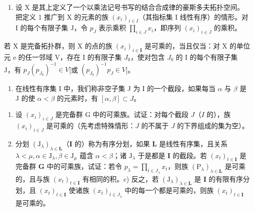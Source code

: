 \ExerciseAppendix

\begin{enumerate}
\def\labelenumi{\arabic{enumi})}
\tightlist
\item
  设 X 是其上定义了一个以乘法记号书写的结合合成律的豪斯多夫拓扑空间。把定义 1 推广到 X 的元素的族 \((x_{i})_{i\in I}\)（其指标集 I 线性有序）的情形。对 I 的每个有限子集 J，令 \(p_{J}\) 表示乘积 \(\prod_{i\in J} x_{i}\)，即序列 \((x_{i})_{i\in J}\) 的乘积。
\end{enumerate}

若 X 是完备拓扑群，则 X 的点的族 \((x_{i})_{i\in\mathbf{I}}\) 是可乘的，当且仅当：对 X 的单位元 e 的任一邻域 V，存在 I 的有限子集 \(J_{0}\)，使对包含 \(J_{0}\) 的 I 的每个有限子集 J，有 \(p_{J}(p_{J_{0}})^{-1}\in V\){[}或 \((p_{J_{0}})^{-1}p_{J}\in V\){]}。

\begin{enumerate}
\def\labelenumi{\arabic{enumi})}
\setcounter{enumi}{1}
\tightlist
\item
  在线性有序集 I 中，我们称非空子集 J 为 I 的一个截段，如果每当 \(\alpha\) 与 \(\beta\) 是 J 的使 \(\alpha < \beta\) 的元素时，有 \([\alpha, \beta] \subset J\)。
\end{enumerate}

\begin{enumerate}
\def\labelenumi{\alph{enumi})}
\item
  设 \((x_{i})_{i\in J}\) 是完备群 G 中的可乘族。试证：对每个截段 \(J\)（\(I\) 的），族 \((x_{i})_{i\in J}\) 是可乘的（先考虑特殊情形：\(J\) 的不属于 \(J\) 的下界组成的集为空）。
\item
  分划 \((\mathrm{J}_{\lambda})_{\lambda \in \mathbf{L}}\)（\(\mathbf{I}\) 的）称为有序分划，如果 \(\mathbf{L}\) 是线性有序集，且关系 \(\lambda < \mu, \alpha \in \mathrm{J}_{\lambda}, \beta \in \mathrm{J}_{\mu}\) 蕴含 \(\alpha < \beta\)；诸 \(\mathrm{J}_{\lambda}\) 于是都是 \(\mathbf{I}\) 的截段。若 \((x_{t})_{t \in \mathbf{I}}\) 是完备群 \(\mathbf{G}\) 中的可乘族，试证：若令 \(p_{\lambda} = \prod_{t \in J_{\lambda}} x_{t}\)，则族 \((\mathrm{P}_{\lambda})_{\lambda \in \mathbf{L}}\) 是可乘的，且与族 \((x_{t})_{t \in \mathbf{I}}\) 有相同的积。c) 反之，若 \((\mathrm{J}_{\lambda})_{\lambda \in \mathbf{L}}\) 是 \(\mathbf{I}\) 的有限有序分划，且 \((x_{t})_{t \in \mathbf{I}}\) 使诸族 \((x_{t})_{t \in J_{\lambda}}\) 中的每一个都是可乘的，则族 \((x_{t})_{t \in \mathbf{I}}\) 是可乘的。
\end{enumerate}

